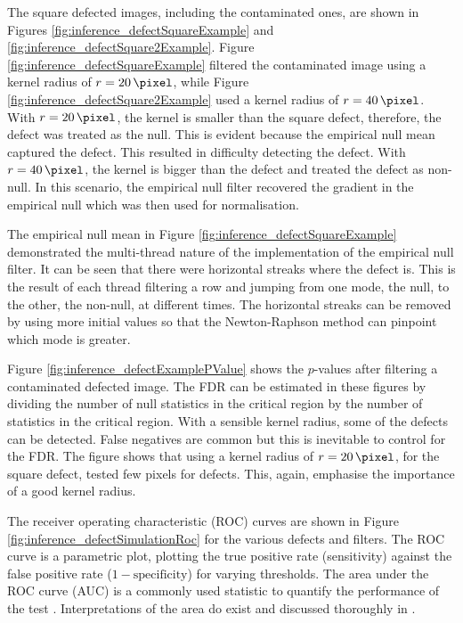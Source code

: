 The square defected images, including the contaminated ones, are shown in Figures \ref{fig:inference_defectSquareExample} and \ref{fig:inference_defectSquare2Example}. Figure \ref{fig:inference_defectSquareExample} filtered the contaminated image using a kernel radius of $r=\SI{20}{\pixel}$, while Figure \ref{fig:inference_defectSquare2Example} used a kernel radius of $r=\SI{40}{\pixel}$. With $r=\SI{20}{\pixel}$, the kernel is smaller than the square defect, therefore, the defect was treated as the null. This is evident because the empirical null mean captured the defect. This resulted in difficulty detecting the defect. With $r=\SI{40}{\pixel}$, the kernel is bigger than the defect and treated the defect as non-null. In this scenario, the empirical null filter recovered the gradient in the empirical null which was then used for normalisation.

The empirical null mean in Figure \ref{fig:inference_defectSquareExample} demonstrated the multi-thread nature of the implementation of the empirical null filter. It can be seen that there were horizontal streaks where the defect is. This is the result of each thread filtering a row and jumping from one mode, the null, to the other, the non-null, at different times. The horizontal streaks can be removed by using more initial values so that the Newton-Raphson method can pinpoint which mode is greater.

Figure \ref{fig:inference_defectExamplePValue} shows the $p$-values after filtering a contaminated defected image. The FDR can be estimated in these figures by dividing the number of null statistics in the critical region by the number of statistics in the critical region. With a sensible kernel radius, some of the defects can be detected. False negatives are common but this is inevitable to control for the FDR. The figure shows that using a kernel radius of $r=\SI{20}{\pixel}$, for the square defect, tested few pixels for defects. This, again, emphasise the importance of a good kernel radius. 

The receiver operating characteristic (ROC) curves \citep{green1966signal, metz1978basic, hanley1982meaning, friedman2001elements, cook2007use} are shown in Figure \ref{fig:inference_defectSimulationRoc} for the various defects and filters. The ROC curve is a parametric plot, plotting the true positive rate (sensitivity) against the false positive rate ($1-\text{specificity}$) for varying thresholds. The area under the ROC curve (AUC) is a commonly used statistic to quantify the performance of the test \citep{friedman2001elements}. Interpretations of the area do exist \citep{metz1978basic,hanley1982meaning} and discussed thoroughly in \cite{cook2007use}.

